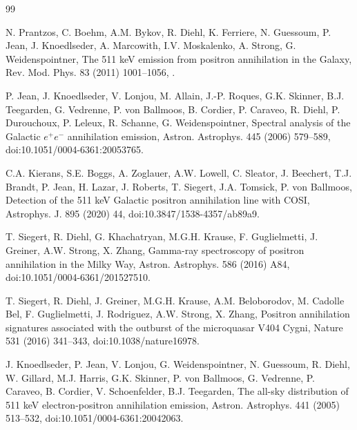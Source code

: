 \documentclass[11pt]{article}
\begin{document}
\begin{thebibliography}{99}

N. Prantzos, C. Boehm, A.M. Bykov, R. Diehl, K. Ferriere, N. Guessoum, P. Jean, J. Knoedlseder, A. Marcowith, I.V. Moskalenko, A. Strong, G. Weidenspointner, The 511 keV emission from positron annihilation in the Galaxy, Rev. Mod. Phys. 83 (2011) 1001--1056, .

P. Jean, J. Knoedlseder, V. Lonjou, M. Allain, J.-P. Roques, G.K. Skinner, B.J. Teegarden, G. Vedrenne, P. von Ballmoos, B. Cordier, P. Caraveo, R. Diehl, P. Durouchoux, P. Leleux, R. Schanne, G. Weidenspointner, Spectral analysis of the Galactic $e^+e^-$ annihilation emission, Astron. Astrophys. 445 (2006) 579--589, doi:10.1051/0004-6361:20053765.

C.A. Kierans, S.E. Boggs, A. Zoglauer, A.W. Lowell, C. Sleator, J. Beechert, T.J. Brandt, P. Jean, H. Lazar, J. Roberts, T. Siegert, J.A. Tomsick, P. von Ballmoos, Detection of the 511 keV Galactic positron annihilation line with COSI, Astrophys. J. 895 (2020) 44, doi:10.3847/1538-4357/ab89a9.

T. Siegert, R. Diehl, G. Khachatryan, M.G.H. Krause, F. Guglielmetti, J. Greiner, A.W. Strong, X. Zhang, Gamma-ray spectroscopy of positron annihilation in the Milky Way, Astron. Astrophys. 586 (2016) A84, doi:10.1051/0004-6361/201527510.

T. Siegert, R. Diehl, J. Greiner, M.G.H. Krause, A.M. Beloborodov, M. Cadolle Bel, F. Guglielmetti, J. Rodriguez, A.W. Strong, X. Zhang, Positron annihilation signatures associated with the outburst of the microquasar V404 Cygni, Nature 531 (2016) 341--343, doi:10.1038/nature16978.

J. Knoedlseder, P. Jean, V. Lonjou, G. Weidenspointner, N. Guessoum, R. Diehl, W. Gillard, M.J. Harris, G.K. Skinner, P. von Ballmoos, G. Vedrenne, P. Caraveo, B. Cordier, V. Schoenfelder, B.J. Teegarden, The all-sky distribution of 511 keV electron-positron annihilation emission, Astron. Astrophys. 441 (2005) 513--532, doi:10.1051/0004-6361:20042063.


\end{thebibliography}
\end{document}
